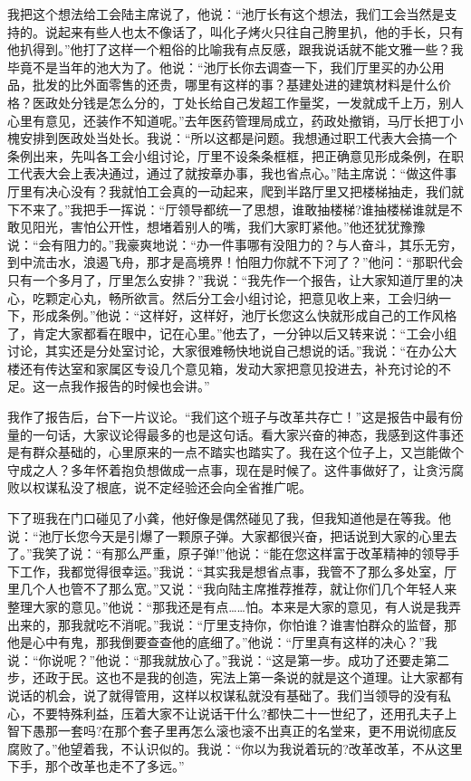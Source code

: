 \documentclass[12pt,oneside]{book}
\begin{document}
我把这个想法给工会陆主席说了，他说：``池厅长有这个想法，我们工会当然是支持的。说起来有些人也太不像话了，叫化子烤火只往自己胯里扒，他的手长，只有他扒得到。''他打了这样一个粗俗的比喻我有点反感，跟我说话就不能文雅一些？我毕竟不是当年的池大为了。他说：``池厅长你去调查一下，我们厅里买的办公用品，批发的比外面零售的还贵，哪里有这样的事？基建处进的建筑材料是什么价格？医政处分钱是怎么分的，丁处长给自己发超工作量奖，一发就成千上万，别人心里有意见，还装作不知道呢。''去年医药管理局成立，药政处撤销，马厅长把丁小槐安排到医政处当处长。我说：``所以这都是问题。我想通过职工代表大会搞一个条例出来，先叫各工会小组讨论，厅里不设条条框框，把正确意见形成条例，在职工代表大会上表决通过，通过了就按章办事，我也省点心。''陆主席说：``做这件事厅里有决心没有？我就怕工会真的一动起来，爬到半路厅里又把楼梯抽走，我们就下不来了。''我把手一挥说：``厅领导都统一了思想，谁敢抽楼梯?谁抽楼梯谁就是不敢见阳光，害怕公开性，想堵着别人的嘴，我们大家盯紧他。''他还犹犹豫豫说：``会有阻力的。''我豪爽地说：``办一件事哪有没阻力的？与人奋斗，其乐无穷，到中流击水，浪遏飞舟，那才是高境界！怕阻力你就不下河了？''他问：``那职代会只有一个多月了，厅里怎么安排？''我说：``我先作一个报告，让大家知道厅里的决心，吃颗定心丸，畅所欲言。然后分工会小组讨论，把意见收上来，工会归纳一下，形成条例。''他说：``这样好，这样好，池厅长您这么快就形成自己的工作风格了，肯定大家都看在眼中，记在心里。''他去了，一分钟以后又转来说：``工会小组讨论，其实还是分处室讨论，大家很难畅快地说自己想说的话。''我说：``在办公大楼还有传达室和家属区专设几个意见箱，发动大家把意见投进去，补充讨论的不足。这一点我作报告的时候也会讲。''

我作了报告后，台下一片议论。``我们这个班子与改革共存亡！''这是报告中最有份量的一句话，大家议论得最多的也是这句话。看大家兴奋的神态，我感到这件事还是有群众基础的，心里原来的一点不踏实也踏实了。我在这个位子上，又岂能做个守成之人？多年怀着抱负想做成一点事，现在是时候了。这件事做好了，让贪污腐败以权谋私没了根底，说不定经验还会向全省推广呢。

下了班我在门口碰见了小龚，他好像是偶然碰见了我，但我知道他是在等我。他说：``池厅长您今天是引爆了一颗原子弹。大家都很兴奋，把话说到大家的心里去了。''我笑了说：``有那么严重，原子弹!''他说：``能在您这样富于改革精神的领导手下工作，我都觉得很幸运。''我说：``其实我是想省点事，我管不了那么多处室，厅里几个人也管不了那么宽。''又说：``我向陆主席推荐推荐，就让你们几个年轻人来整理大家的意见。''他说：``那我还是有点\ldots\ldots 怕。本来是大家的意见，有人说是我弄出来的，那我就吃不消呢。''我说：``厅里支持你，你怕谁？谁害怕群众的监督，那他是心中有鬼，那我倒要查查他的底细了。''他说：``厅里真有这样的决心？''我说：``你说呢？''他说：``那我就放心了。''我说：``这是第一步。成功了还要走第二步，还政于民。这也不是我的创造，宪法上第一条说的就是这个道理。让大家都有说话的机会，说了就得管用，这样以权谋私就没有基础了。我们当领导的没有私心，不要特殊利益，压着大家不让说话干什么?都快二十一世纪了，还用孔夫子上智下愚那一套吗?在那个套子里再怎么滚也滚不出真正的名堂来，更不用说彻底反腐败了。''他望着我，不认识似的。我说：``你以为我说着玩的?改革改革，不从这里下手，那个改革也走不了多远。''
\end{document}
